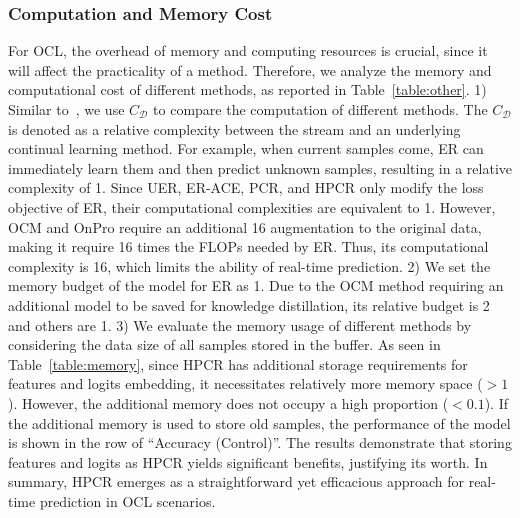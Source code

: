 \subsubsection{Computation and Memory Cost} For OCL, the overhead of memory and computing resources is crucial, since it will affect the practicality of a method. Therefore, we analyze the memory and computational cost of different methods, as reported in Table~\ref{table:other}. 1) Similar to~\cite{ghunaim2023real}, we use $C_\mathcal{D}$ to compare the computation of different methods. The $C_\mathcal{D}$ is denoted as a relative complexity between the stream and an underlying continual learning method. For example, when current samples come, ER can immediately learn them and then predict unknown samples, resulting in a relative complexity of 1. Since UER, ER-ACE, PCR, and HPCR only modify the loss objective of ER, their computational complexities are equivalent to 1. However, OCM and OnPro require an additional 16 augmentation to the original data, making it require 16  times the FLOPs needed by ER. Thus, its computational complexity is 16, which limits the ability of real-time prediction. 2) We set the memory budget of the model for ER as 1. Due to the OCM method requiring an additional model to be saved for knowledge distillation, its relative budget is 2 and others are 1. 3) We evaluate the memory usage of different methods by considering the data size of all samples stored in the buffer. As seen in Table~\ref{table:memory}, since HPCR has additional storage requirements for features and logits embedding, it necessitates relatively more memory space ($>1$). However, the additional memory does not occupy a high proportion ($<0.1$). If the additional memory is used to store old samples, the performance of the model is shown in the row of ``Accuracy (Control)''. The results demonstrate that storing features and logits as HPCR yields significant benefits, justifying its worth. In summary, HPCR emerges as a straightforward yet efficacious approach for real-time prediction in OCL scenarios.



